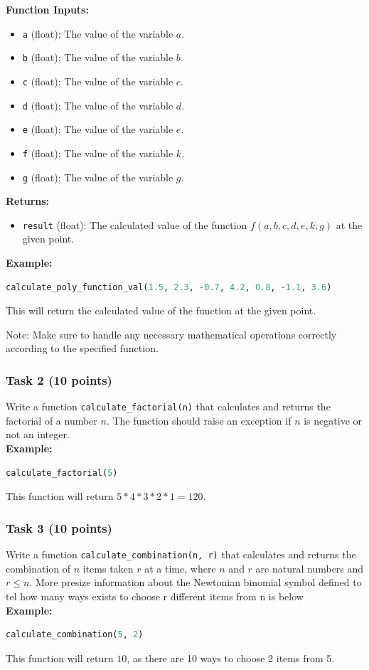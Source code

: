 \documentclass[12pt]{article}
\begin{document}
\textbf{Function Inputs:}
\begin{itemize}
\item \texttt{a} (float): The value of the variable $a$.
\item \texttt{b} (float): The value of the variable $b$.
\item \texttt{c} (float): The value of the variable $c$.
\item \texttt{d} (float): The value of the variable $d$.
\item \texttt{e} (float): The value of the variable $e$.
\item \texttt{f} (float): The value of the variable $k$.
\item \texttt{g} (float): The value of the variable $g$.
\end{itemize}

\textbf{Returns:}
\begin{itemize}
\item \texttt{result} (float): The calculated value of the function $f(a, b, c, d, e, k, g)$ at the given point.
\end{itemize}

\textbf{Example:}
\begin{lstlisting}[language=Python]
calculate_poly_function_val(1.5, 2.3, -0.7, 4.2, 0.8, -1.1, 3.6)
\end{lstlisting}
This will return the calculated value of the function at the given point.

Note: Make sure to handle any necessary mathematical operations correctly according to the specified function.

\subsubsection{Task 2 (10 points)}
Write a function \texttt{calculate\_factorial(n)} that calculates and returns the factorial of a number $n$. The function should raise an exception if $n$ is negative or not an integer. \\
\textbf{Example:}
\begin{lstlisting}[language=Python]
calculate_factorial(5)
\end{lstlisting}
This function will return $5*4*3*2*1 = 120$.

\subsubsection{Task 3 (10 points)}
Write a function \texttt{calculate\_combination(n, r)} that calculates and returns the combination of $n$ items taken $r$ at a time, where $n$ and $r$ are natural numbers and $r \leq n$. More presize information about the Newtonian binomial symbol defined to tel how many ways exists to choose r different items from n is below \\
\textbf{Example:}
\begin{lstlisting}[language=Python]
calculate_combination(5, 2)
\end{lstlisting}
This function will return $10$, as there are 10 ways to choose 2 items from 5.
\end{document}
